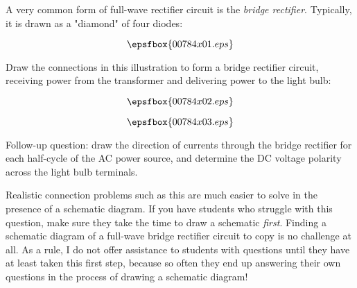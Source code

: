 

A very common form of full-wave rectifier circuit is the {\it bridge rectifier}.  Typically, it is drawn as a "diamond" of four diodes:

$$\epsfbox{00784x01.eps}$$

Draw the connections in this illustration to form a bridge rectifier circuit, receiving power from the transformer and delivering power to the light bulb:

$$\epsfbox{00784x02.eps}$$







$$\epsfbox{00784x03.eps}$$

\vskip 10pt

Follow-up question: draw the direction of currents through the bridge rectifier for each half-cycle of the AC power source, and determine the DC voltage polarity across the light bulb terminals.







Realistic connection problems such as this are much easier to solve in the presence of a schematic diagram.  If you have students who struggle with this question, make sure they take the time to draw a schematic {\it first}.  Finding a schematic diagram of a full-wave bridge rectifier circuit to copy is no challenge at all.  As a rule, I do not offer assistance to students with questions until they have at least taken this first step, because so often they end up answering their own questions in the process of drawing a schematic diagram!





